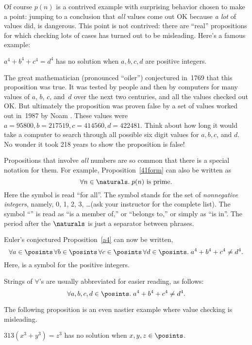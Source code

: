 Of course $p(n)$ is a contrived example with surprising behavior
chosen to make a point: jumping to a conclusion that \emph{all} values
come out OK because \emph{a lot} of values did, is dangerous.  This
point is not contrived: there are ``real'' propositions for which
checking lots of cases has turned out to be misleading.  Here's a
famous example:
\begin{proposition}\label{a4}
$a^4 + b^4 + c^4 = d^4$ has no solution when $a, b, c, d$ are positive
integers.
\end{proposition}
The great mathematician  (pronounced ``oiler'') conjectured
in~1769 that this proposition was true.  It was tested by people and
then by computers for many values of $a$, $b$, $c$, and~$d$ over the
next two centuries, and all the values checked out OK.  But ultimately
the proposition was proven false by a set of values worked out in~1987
by Noam .  These values were $a = 95800, b = 217519, c =
414560, d = 422481$.  Think about how long it would take a computer to
search through all possible six digit values for $a,b,c$, and $d$.
No wonder it took 218 years to show the proposition is false!

Propositions that involve \emph{all} numbers are so common that there
is a special notation for them.  For example, Proposition~\ref{41form}
can also be written as
\begin{equation}\label{pn}
\forall n \in \naturals.\; p(n) \text{ is prime}.
\end{equation}
Here the symbol \term{$\forall$} is read ``for all''.  The symbol
\term{$\naturals$} stands for the set of \emph{nonnegative integers},
namely, 0, 1, 2, 3, \dots (ask your instructor for the complete list).
The symbol ``\term{$\in$}'' is read as ``is a member of,'' or
``belongs to,'' or simply as ``is in''.  The period after the
$\naturals$ is just a separator between phrases.

Euler's conjectured Proposition~\ref{a4} can now be written,
\[
\forall a \in \posints\, \forall b \in \posints\, \forall c \in
\posints\, \forall d \in \posints.\; a^4 + b^4 + c^4 \neq d^4.
\]
Here, \term{$\posints$} is a symbol for the positive integers.

Strings of $\forall$'s are usually abbreviated for easier reading, as
follows:
\[
\forall a, b, c, d \in \posints.\; a^4 + b^4 + c^4 \neq d^4.
\]

The following proposition is an even nastier example where value
checking is misleading.
\begin{proposition}\label{313elliptic}
$313 (x^3 + y^3) = z^3$ has no solution when $x, y, z\in\posints$.
\end{proposition}

